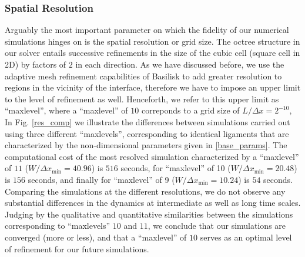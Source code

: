 \subsubsection*{Spatial Resolution}

Arguably the most important parameter on which the fidelity of our
numerical simulations hinges on is the spatial resolution or grid size. 
The octree structure in our solver entails successive refinements in the  
size of the cubic cell (square cell in 2D) by factors of $2$ in each direction.
As we have discussed before, we use the adaptive mesh refinement capabilities 
of Basilisk to add greater resolution to regions in the vicinity of the interface, 
therefore we have to impose an upper limit to the level of refinement as well. 
Henceforth, we refer to this upper limit as ``maxlevel'', 
where a ``maxlevel'' of $10$ correponds to a grid size of $L/ \Delta x = 2^{-10}$,  
In Fig. \ref{res_comp} we illustrate the differences between simulations carried out
using three different ``maxlevels'', corresponding to identical ligaments that
are characterized by the non-dimensional parameters given in \eqref{base_params}.
The computational cost of the most resolved simulation characterized by a ``maxlevel''
of $11$ ($W / \Delta x_{\textrm{min}} = 40.96$) is $516$ seconds, 
for ``maxlevel'' of 10 ($W / \Delta x_{\textrm{min}} = 20.48$) is $156$ seconds, and finally 
for ``maxlevel'' of 9 ($W / \Delta x_{\textrm{min}} = 10.24$) is $54$ seconds. 
Comparing the simulations at the different resolutions, we do not observe any substantial 
differences in the dynamics at intermediate as well as long time scales.
Judging by the qualitative and quantitative similarities between the simulations corresponding 
to ``maxlevels'' $10$ and $11$, we conclude that our simulations are converged (more or less),
and that a ``maxlevel'' of $10$ serves as an optimal level of refinement for our future simulations.  


